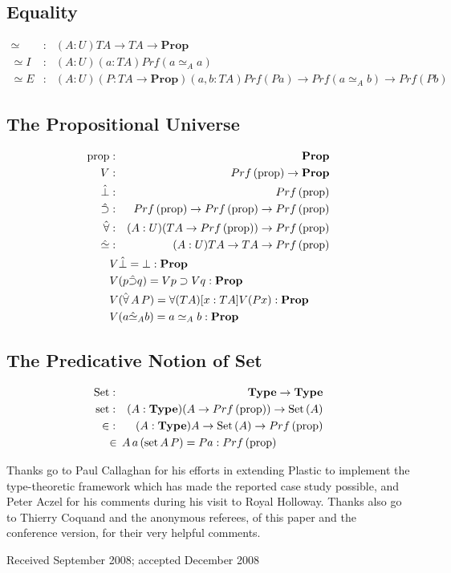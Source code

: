 \documentclass[acmtocl]{acmtrans2m}
\newcommand{\Type}{\mathbf{Type}}
\newcommand{\Prop}{\mathbf{Prop}}
\newcommand{\Prf}[1]{Prf \left( {#1} \right)}
\newcommand{\Set}[1]{\mathrm{Set} \left( {#1} \right)}
\newcommand{\p}{\mathrm{prop}}
\newcommand{\set}{\mathrm{set}}
\begin{document}
\subsection{Equality}
\begin{eqnarray*}
\simeq & : & (A : U) T A \rightarrow T A \rightarrow \Prop \\
\simeq I & : & (A : U) (a : T A) \Prf{a \simeq_A a} \\
\simeq E & : & (A : U) (P : T A \rightarrow \Prop) (a, b : T A) \Prf{P a} \rightarrow \Prf{a \simeq_A b} \rightarrow \Prf{P b}
\end{eqnarray*}
\subsection{The Propositional Universe}
\begin{eqnarray*}
\p & : & \Prop \\
V & : & \Prf{\p} \rightarrow \Prop \\
\hat{\bot} & : & \Prf{\p} \\
\hat{\supset} & : & \Prf{\p} \rightarrow \Prf{\p} \rightarrow \Prf{\p} \\
\hat{\forall} & : & (A : U) (T A \rightarrow \Prf{\p}) \rightarrow \Prf{\p} \\
\hat{\simeq} & : & (A : U) T A \rightarrow T A \rightarrow \Prf{\p} \\
\lefteqn{V \hat{\bot} = \bot : \Prop} \\
\lefteqn{V (p \hat{\supset} q) = V p \supset V q : \Prop} \\
\lefteqn{V (\hat{\forall} \, A \, P) = \forall (T A) [x : T A] V (P x) : \Prop} \\
\lefteqn{V (a \hat{\simeq}_A b) = a \simeq_A b : \Prop}
\end{eqnarray*}
\subsection{The Predicative Notion of Set}
\begin{eqnarray*}
\mathrm{Set} & : & \Type \rightarrow \Type \\
\set & : & (A : \Type) (A \rightarrow \Prf{\p}) \rightarrow \Set{A} \\
\in & : & (A : \Type) A \rightarrow \Set{A} \rightarrow \Prf{\p} \\
\lefteqn{\in \, A \, a \, (\set \, A \, P) = P a : \Prf{\p}}
\end{eqnarray*}


\begin{acks}
Thanks go to Paul Callaghan for his efforts in extending Plastic to
implement the type-theoretic framework which has made the reported
case study possible, and Peter Aczel for his comments during his
visit to Royal Holloway. Thanks also go to Thierry Coquand and the
anonymous referees, of this paper and the conference version, for
their very helpful comments.
\end{acks}


\begin{received}
Received September 2008;
accepted December 2008
\end{received}
\end{document}

